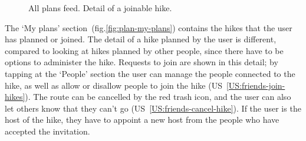 \begin{figure}[h!]
    \centering
    \hfill
    \hfill
    \caption{All plans feed. Detail of a joinable hike.}
    \label{fig:plan-all-plans}
\end{figure}

The `My plans' section~(fig.\ref{fig:plan-my-plans}) contains the hikes that the user has planned or joined.
The detail of a hike planned by the user is different, compared to looking at hikes planned by other people,
since there have to be options to administer the hike.
Requests to join are shown in this detail; by tapping at the `People' section the user can manage the people connected to the hike, as well as allow or disallow people to join the hike (US~\ref{US:friends-join-hikes}).
The route can be cancelled by the red trash icon, and the user can also let others know that they can't go (US~\ref{US:friends-cancel-hike}).
If the user is the host of the hike, they have to appoint a new host from the people who have accepted the invitation.

